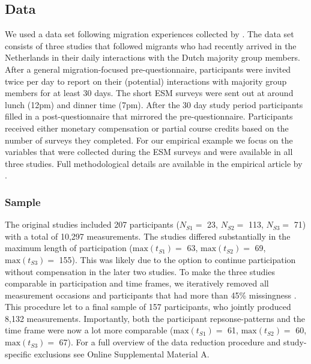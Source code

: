 \subsection{Data}

We used a data set following migration experiences collected by
\citet[][]{Kreienkamp2022b}. The data set consists of three studies that
followed migrants who had recently arrived in the Netherlands in their
daily interactions with the Dutch majority group members. After a
general migration-focused pre-questionnaire, participants were invited
twice per day to report on their (potential) interactions with majority
group members for at least 30 days. The short ESM surveys were sent out
at around lunch (12pm) and dinner time (7pm). After the 30 day study
period participants filled in a post-questionnaire that mirrored the
pre-questionnaire. Participants received either monetary compensation or
partial course credits based on the number of surveys they completed.
For our empirical example we focus on the variables that were collected
during the ESM surveys and were available in all three studies. Full
methodological details are available in the empirical article by
\citet[][]{Kreienkamp2022b}.

\subsubsection{Sample}

The original studies included 207 participants (\(N_{S1}=\) 23,
\(N_{S2}=\) 113, \(N_{S3}=\) 71) with a total of 10,297 measurements.
The studies differed substantially in the maximum length of
participation (\(\text{max}(t_{S1})=\) 63, \(\text{max}(t_{S2})=\) 69,
\(\text{max}(t_{S3})=\) 155). This was likely due to the option to
continue participation without compensation in the later two studies. To
make the three studies comparable in participation and time frames, we
iteratively removed all measurement occasions and participants that had
more than 45\% missingness
\citep[which was in line with the general rcecommendation for data that might still need to rely on imputations for later model testing][]{Madley-Dowd2019}.
This procedure let to a final sample of 157 participants, who jointly
produced 8,132 measurements. Importantly, both the participant
repsonse-patterns and the time frame were now a lot more comparable
(\(\text{max}(t_{S1})=\) 61, \(\text{max}(t_{S2})=\) 60,
\(\text{max}(t_{S3})=\) 67). For a full overview of the data reduction
procedure and study-specific exclusions see Online Supplemental Material
A.

